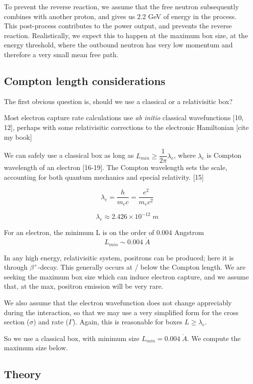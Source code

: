 \documentclass[11pt]{amsart}
\begin{document}
To prevent the reverse reaction, we assume that the free neutron subsequently combines with another proton, and gives us 2.2 GeV of energy in the process.  This post-process contributes to the power output, and prevents the reverse reaction.  Realistically, we expect this to happen at the maximum box size, at the energy threshold, where the outbound neutron has very low momentum and therefore a very small mean free path.  

\subsection{Compton length considerations}
The first obvious question is, should we use a classical or a relativisitic box?   

Most electron capture rate calculations use \emph{ab initio} classical wavefunctions [10, 12], perhaps with some relativisitic corrections to the electronic Hamiltonian [cite my book]

We can safely use a classical box as long as $L_{min} \ge \dfrac{1}{2\pi}\lambda_{e}$, where $\lambda_{e}$ is Compton wavelength of an electron [16-19].  The Compton wavelength sets the scale, accounting for both quantum mechanics and special relativity. [15]

$$\lambda_{e}=\dfrac{h}{m_{e}c}=\dfrac{e^{2}}{m_{e}c^{2}}$$

$$\lambda_{e}\approx2.426\times 10^{-12}\;m$$

For an electron, the minimum L is on the order of 0.004 Angstrom 
$$L_{min}\sim0.004\;\mathring{A}$$ 

In any high energy, relativisitic system, positrons can be produced; here it is through $\beta^{+}$-decay. This generally occurs at / below the Compton length. We are seeking the maximum box size which can induce electron capture, and we assume that, at the max, positron emission will be very rare.

We also assume that the electron wavefunction does not change appreciably during the interaction, so that we may use a very simplified form for the cross section ($\sigma$) and rate ($\Gamma$).  Again, this is reasonable for boxes $L\ge\lambda_{e}$.

So we use a classical box, with minimum size $L_{min}=0.004\;\mathring{A}$.  We compute the maximum size below.

\subsection{Theory}
\end{document}
